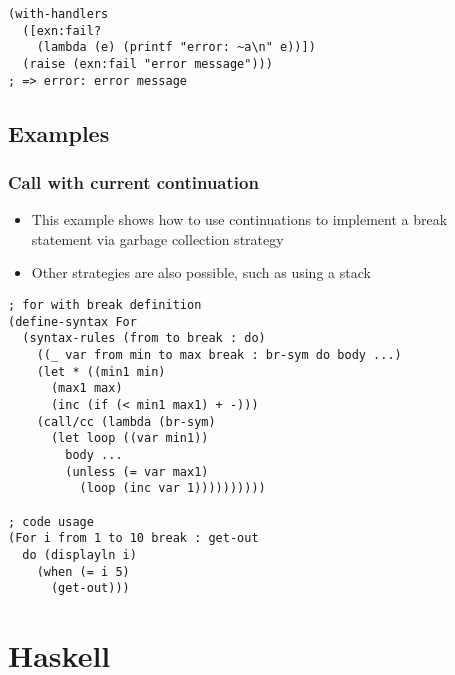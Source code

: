 \documentclass[a4paper,landscape,10pt]{article}
\begin{document}
\begin{multicols*}{2}
  \begin{lstlisting}[language=Racket]
(with-handlers
  ([exn:fail?
    (lambda (e) (printf "error: ~a\n" e))])
  (raise (exn:fail "error message")))
; => error: error message
  \end{lstlisting}

  \breakcolumn

  \subsection{Examples}

  \subsubsection{Call with current continuation}

  \begin{itemize}
    \item This example shows how to use continuations to implement a break statement via garbage collection strategy
    \item Other strategies are also possible, such as using a stack
  \end{itemize}

  \begin{lstlisting}[language=Racket]
; for with break definition
(define-syntax For
  (syntax-rules (from to break : do)
    ((_ var from min to max break : br-sym do body ...)
    (let * ((min1 min)
      (max1 max)
      (inc (if (< min1 max1) + -)))
    (call/cc (lambda (br-sym)
      (let loop ((var min1))
        body ...
        (unless (= var max1)
          (loop (inc var 1))))))))))

; code usage
(For i from 1 to 10 break : get-out
  do (displayln i)
    (when (= i 5)
      (get-out)))
  \end{lstlisting}

\end{multicols*}

\clearpage

\section{Haskell}
\end{document}
